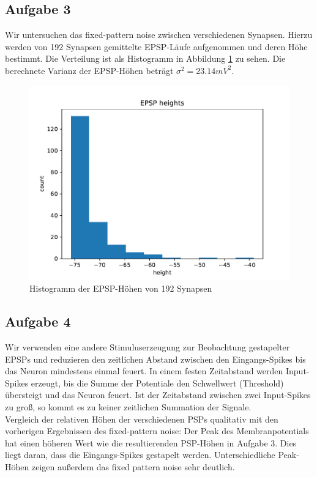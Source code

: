 \documentclass[10pt,a4paper]{scrartcl}
\begin{document}
\subsection{Aufgabe 3}
Wir untersuchen das fixed-pattern noise zwischen verschiedenen Synapsen. Hierzu werden von 192 Synapsen gemittelte EPSP-Läufe aufgenommen und deren Höhe bestimmt. Die Verteilung ist als Histogramm in Abbildung \ref{fig:abb10} zu sehen. Die berechnete Varianz der EPSP-Höhen beträgt $\sigma^2= 23.14mV^2$.

\begin{figure} [ht]
\begin{center}
\label{fig:abb10}
\caption{Histogramm der EPSP-Höhen von 192 Synapsen}
\includegraphics[scale=0.35]{pictures/epsp_heights.pdf} 
\end{center}
\end{figure}


\subsection{Aufgabe 4}
Wir verwenden eine andere Stimuluserzeugung zur Beobachtung gestapelter
EPSPs und reduzieren den zeitlichen Abstand zwischen den Eingangs-Spikes
bis das Neuron mindestens einmal feuert. In einem festen Zeitabstand werden Input-Spikes erzeugt, bis die Summe der Potentiale den Schwellwert (Threshold) übersteigt und das Neuron feuert. Ist der Zeitabstand zwischen zwei Input-Spikes zu groß, so kommt es zu keiner zeitlichen Summation der Signale.\\

\noindent Vergleich der relativen Höhen der verschiedenen PSPs qualitativ mit den vorherigen Ergebnissen des fixed-pattern noise: Der Peak des Membranpotentials hat einen höheren Wert wie die resultierenden PSP-Höhen in Aufgabe 3. Dies liegt daran, dass die Eingangs-Spikes gestapelt werden. Unterschiedliche Peak-Höhen zeigen außerdem das fixed pattern noise sehr deutlich.
\end{document}
